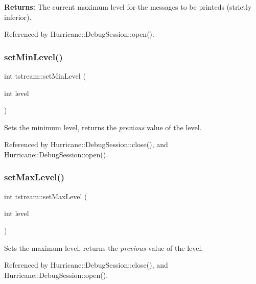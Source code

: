 {\bfseries Returns\+:} The current maximum level for the messages to be printeds (strictly inferior). 

Referenced by Hurricane\+::\+Debug\+Session\+::open().

\mbox{\label{clasststream_a0dad8cbc8fc5611b788f55c75a20a88e}} 
\subsubsection{\texorpdfstring{set\+Min\+Level()}{setMinLevel()}}
{\footnotesize\ttfamily int tstream\+::set\+Min\+Level (\begin{DoxyParamCaption}\item[{int}]{level }\end{DoxyParamCaption})\hspace{0.3cm}{\ttfamily [inline]}}

Sets the minimum level, returns the {\itshape previous} value of the level. 

Referenced by Hurricane\+::\+Debug\+Session\+::close(), and Hurricane\+::\+Debug\+Session\+::open().

\mbox{\label{clasststream_a75cb778234d7b49d9e89c73e6efcd132}} 
\subsubsection{\texorpdfstring{set\+Max\+Level()}{setMaxLevel()}}
{\footnotesize\ttfamily int tstream\+::set\+Max\+Level (\begin{DoxyParamCaption}\item[{int}]{level }\end{DoxyParamCaption})\hspace{0.3cm}{\ttfamily [inline]}}

Sets the maximum level, returns the {\itshape previous} value of the level. 

Referenced by Hurricane\+::\+Debug\+Session\+::close(), and Hurricane\+::\+Debug\+Session\+::open().

\mbox{\label{clasststream_a01c90e5cc80064cae20d3a4bc3320683}} 
